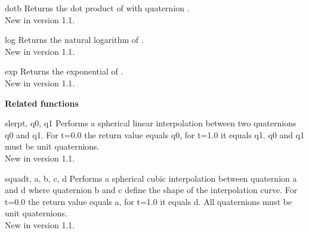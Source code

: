\begin{methoddesc}{dot}{b}
Returns the dot product of  with quaternion .\\
New in version 1.1.
\end{methoddesc}

\begin{methoddesc}{log}{}
Returns the natural logarithm of .\\
New in version 1.1.
\end{methoddesc}

\begin{methoddesc}{exp}{}
Returns the exponential of . \\
New in version 1.1.
\end{methoddesc}

{\bf Related functions}

\begin{funcdesc}{slerp}{t, q0, q1}
Performs a spherical linear interpolation between two quaternions q0
and q1. For t=0.0 the return value equals q0, for t=1.0 it equals
q1. q0 and q1 must be unit quaternions. \\
New in version 1.1.
\end{funcdesc}

\begin{funcdesc}{squad}{t, a, b, c, d}
Performs a spherical cubic interpolation between quaternion a and d
where quaternion b and c define the shape of the interpolation
curve. For t=0.0 the return value equals a, for t=1.0 it equals d. All
quaternions must be unit quaternions. \\
New in version 1.1.
\end{funcdesc}



